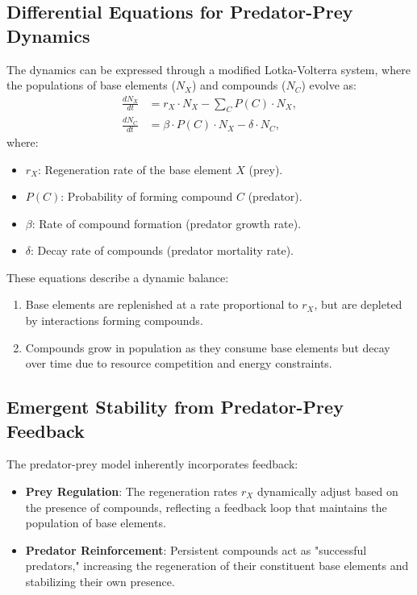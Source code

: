 \documentclass[entropy,article,submit,pdftex,moreauthors]{Definitions/mdpi}
\begin{document}
\subsection{Differential Equations for Predator-Prey Dynamics}

The dynamics can be expressed through a modified Lotka-Volterra system, where the populations of base elements (\( N_X \)) and compounds (\( N_C \)) evolve as:
\begin{align}
\frac{dN_X}{dt} &= r_X \cdot N_X - \sum_C P(C) \cdot N_X, \\
\frac{dN_C}{dt} &= \beta \cdot P(C) \cdot N_X - \delta \cdot N_C,
\end{align}
where:
\begin{itemize}
    \item \( r_X \): Regeneration rate of the base element \( X \) (prey).
    \item \( P(C) \): Probability of forming compound \( C \) (predator).
    \item \( \beta \): Rate of compound formation (predator growth rate).
    \item \( \delta \): Decay rate of compounds (predator mortality rate).
\end{itemize}

These equations describe a dynamic balance:
\begin{enumerate}
    \item Base elements are replenished at a rate proportional to \( r_X \), but are depleted by interactions forming compounds.
    \item Compounds grow in population as they consume base elements but decay over time due to resource competition and energy constraints.
\end{enumerate}

\subsection{Emergent Stability from Predator-Prey Feedback}

The predator-prey model inherently incorporates feedback:
\begin{itemize}
    \item \textbf{Prey Regulation}: The regeneration rates \( r_X \) dynamically adjust based on the presence of compounds, reflecting a feedback loop that maintains the population of base elements.
    \item \textbf{Predator Reinforcement}: Persistent compounds act as "successful predators," increasing the regeneration of their constituent base elements and stabilizing their own presence.
\end{itemize}
\end{document}
